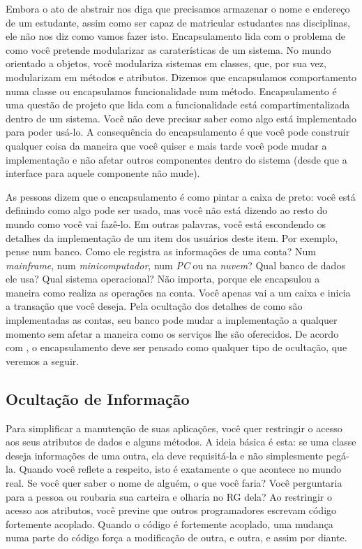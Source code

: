 Embora o ato de abstrair nos diga que precisamos armazenar o nome e endereço de um estudante, assim como ser capaz de matricular estudantes nas disciplinas, ele não nos diz como vamos fazer isto. Encapsulamento lida com o problema de como você pretende modularizar as caraterísticas de um sistema. No mundo orientado a objetos, você modulariza sistemas em classes, que, por sua vez, modularizam em métodos e atributos. Dizemos que encapsulamos comportamento numa classe ou encapsulamos funcionalidade num método. Encapsulamento é uma questão de projeto que lida com a funcionalidade está compartimentalizada dentro de um sistema. Você não deve precisar saber como algo está implementado para poder usá-lo. A consequência do encapsulamento é que você pode construir qualquer coisa da maneira que você quiser e mais tarde você pode mudar a implementação e não afetar outros componentes dentro do sistema (desde que a interface para aquele componente não mude).

As pessoas dizem que o encapsulamento é como pintar a caixa de preto: você está definindo como algo pode ser usado, mas você não está dizendo ao resto do mundo como você vai fazê-lo. Em outras palavras, você está escondendo os detalhes da implementação de um item dos usuários deste item. Por exemplo, pense num banco. Como ele registra as informações de uma conta? Num \textit{mainframe}, num \textit{minicomputador}, num \textit{PC} ou na \emph{nuvem}? Qual banco de dados ele usa? Qual sistema operacional? Não importa, porque ele encapsulou a maneira como realiza as operações na conta. Você apenas vai a um caixa e inicia a transação que você deseja. Pela ocultação dos detalhes de como são implementadas as contas, seu banco pode mudar a implementação a qualquer momento sem afetar a maneira como os serviços lhe são oferecidos. De acordo com \cite{DP:explained}, o encapsulamento deve ser pensado como qualquer tipo de ocultação, que veremos a seguir.

\subsection{Ocultação de Informação}

Para simplificar a manutenção de suas aplicações, você quer restringir o acesso aos seus atributos de dados e alguns métodos. A ideia básica é esta: se uma classe deseja informações de uma outra, ela deve requisitá-la e não simplesmente pegá-la. Quando você reflete a respeito, isto é exatamente o que acontece no mundo real. Se você quer saber o nome de alguém, o que você faria? Você perguntaria para a pessoa ou roubaria sua carteira e olharia no RG dela? Ao restringir o acesso aos atributos, você previne que outros programadores escrevam código fortemente acoplado. Quando o código é fortemente acoplado, uma mudança numa parte do código força a modificação de outra, e outra, e assim por diante.

